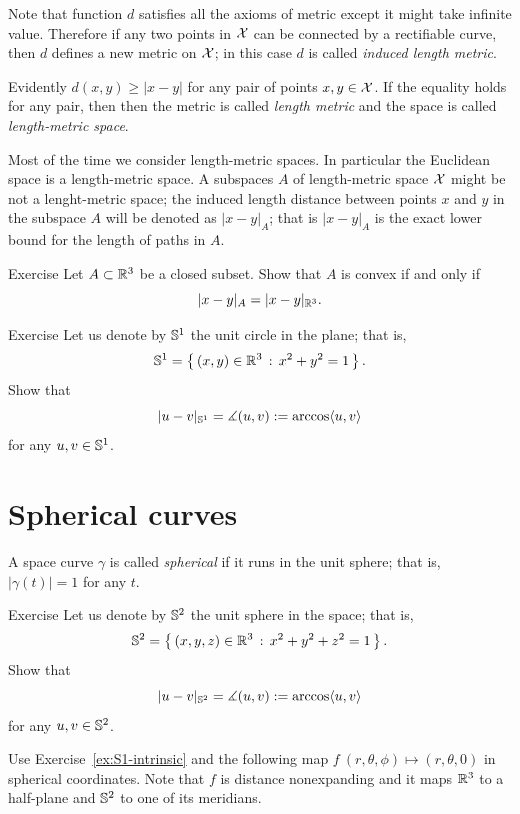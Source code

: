Note that function $d$ satisfies all the axioms of metric except it might take infinite value.
Therefore if any two points in $\mathcal{X}$ can be connected by a rectifiable curve, then $d$ defines a new metric on $\mathcal{X}$; in this case $d$ is called \emph{induced length metric}.

Evidently $d(x,y)\ge |x-y|$ for any pair of points $x,y\in \mathcal{X}$.
If the equality holds for any pair, then then the metric is called \emph{length metric} and the space is called \emph{length-metric space}.

Most of the time we consider length-metric spaces.
In particular the Euclidean space is a length-metric space.
A subspaces $A$ of length-metric space $\mathcal{X}$ might be not a lenght-metric space;
the induced length distance between points $x$ and $y$ in the subspace $A$ will be denoted as $|x-y|_A$;
that is $|x-y|_A$ is the exact lower bound for the length of paths in $A$.

\begin{thm}{Exercise}\label{ex:intrinsic-convex}
Let $A\subset \mathbb{R}^3$ be a closed subset.
Show that $A$ is convex if and only if
\[|x-y|_A=|x-y|_{\mathbb{R}^3}.\]
\end{thm}

\begin{thm}{Exercise}\label{ex:S1-intrinsic}
Let us denote by $\mathbb{S}^1$ the unit circle in the plane; that is,
\[\mathbb{S}^1=\left\{\,{(x,y)\in\mathbb{R}^3}\,:\,{x^2+y^2=1}\,\right\}.\]
Show that
\[|u-v|_{\mathbb{S}^1}=\measuredangle(u,v):=\arccos\langle u,v\rangle\]
for any $u,v\in \mathbb{S}^1$.
\end{thm}

\section*{Spherical curves}

A space curve $\gamma$ is called \emph{spherical} if it runs in the unit sphere;
that is, $|\gamma(t)|=1$ for any $t$.

\begin{thm}{Exercise}\label{ex:S2-intrinsic}
Let us denote by $\mathbb{S}^2$ the unit sphere in the space; that is,
\[\mathbb{S}^2=\left\{\,{(x,y,z)\in\mathbb{R}^3}\,:\,{x^2+y^2+z^2=1}\,\right\}.\]
Show that
\[|u-v|_{\mathbb{S}^2}=\measuredangle(u,v):=\arccos\langle u,v\rangle\]
for any $u,v\in \mathbb{S}^2$.
\end{thm}

 Use Exercise~\ref{ex:S1-intrinsic} and the following map $f\:(r,\theta,\phi)\mapsto (r,\theta,0)$ in spherical coordinates. Note that $f$ is distance nonexpanding and it maps $\mathbb{R}^3$ to a half-plane and $\mathbb{S}^2$ to one of its meridians.

